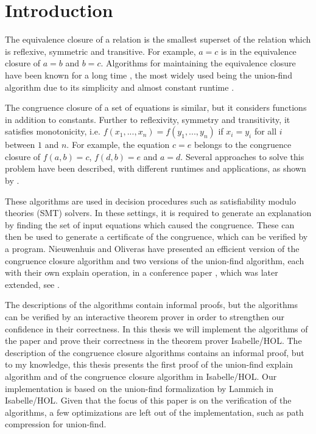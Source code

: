 
\chapter{Introduction}\label{chapter:introduction}

The equivalence closure of a relation is the smallest superset of the relation which is reflexive, symmetric and transitive. For example, $a = c$ is in the equivalence closure of $a = b$ and $b = c$. Algorithms for maintaining the equivalence closure have been known for a long time \cite{unionfind-og}, the most widely used being the union-find algorithm due to its simplicity and almost constant runtime \cite{Tarjan}.

The congruence closure of a set of equations is similar, but it considers functions in addition to constants. Further to reflexivity, symmetry and transitivity, it satisfies monotonicity, i.e. $f(x_1, ... ,x_n) = f(y_1, ... ,y_n)$ if $x_i = y_i$ for all $i$ between $1$ and $n$. \cite{Nieuwenhuis} For example, the equation $c = e$ belongs to the congruence closure of $f(a,b) = c$, $f(d,b) = e$ and $a = d$. Several approaches to solve this problem have been described, with different runtimes and applications, as shown by \cite{congruenceclosure-og2,congruenceclosure-og,congruenceclosure-og3,Nieuwenhuis}.

These algorithms are used in decision procedures such as satisfiability modulo theories (SMT) solvers. \cite{z3} In these settings, it is required to generate an explanation by finding the set of input equations which caused the congruence. These can then be used to generate a certificate of the congruence, which can be verified by a program. Nieuwenhuis and Oliveras have presented an efficient version of the congruence closure algorithm and two versions of the union-find algorithm, each with their own explain operation, in a conference paper \cite{Nieuwenhuis}, which was later extended, see \cite{Nieuwenhuis2}.

The descriptions of the algorithms contain informal proofs, but the algorithms can be verified by an interactive theorem prover in order to strengthen our confidence in their correctness. In this thesis we will implement the algorithms of the paper \cite{Nieuwenhuis} and prove their correctness in the theorem prover Isabelle/HOL.  The description of the congruence closure algorithms contains an informal proof, but to my knowledge, this thesis presents the first proof of the union-find explain algorithm and of the congruence closure algorithm in Isabelle/HOL. Our implementation is based on the union-find formalization by Lammich \cite{unionfind-isabelle} in Isabelle/HOL. Given that the focus of this paper is on the verification of the algorithms, a few optimizations are left out of the implementation, such as path compression for union-find.


